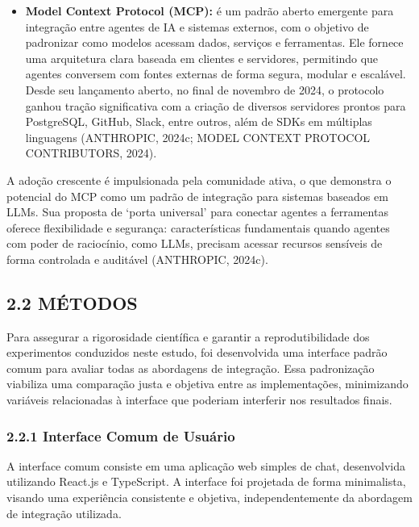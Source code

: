 \documentclass[
]{article}
\providecommand{\tightlist}{%
  \setlength{\itemsep}{0pt}\setlength{\parskip}{0pt}}
\begin{document}
\begin{itemize}
\tightlist
\item
  \textbf{Model Context Protocol (MCP):} é um padrão aberto emergente
  para integração entre agentes de IA e sistemas externos, com o
  objetivo de padronizar como modelos acessam dados, serviços e
  ferramentas. Ele fornece uma arquitetura clara baseada em clientes e
  servidores, permitindo que agentes conversem com fontes externas de
  forma segura, modular e escalável. Desde seu lançamento aberto, no
  final de novembro de 2024, o protocolo ganhou tração significativa com
  a criação de diversos servidores prontos para PostgreSQL, GitHub,
  Slack, entre outros, além de SDKs em múltiplas linguagens (ANTHROPIC,
  2024c; MODEL CONTEXT PROTOCOL CONTRIBUTORS, 2024).
\end{itemize}

A adoção crescente é impulsionada pela comunidade ativa, o que demonstra
o potencial do MCP como um padrão de integração para sistemas baseados
em LLMs. Sua proposta de `porta universal' para conectar agentes a
ferramentas oferece flexibilidade e segurança: características
fundamentais quando agentes com poder de raciocínio, como LLMs, precisam
acessar recursos sensíveis de forma controlada e auditável (ANTHROPIC,
2024c).

\subsection{2.2 MÉTODOS}\label{muxe9todos}

Para assegurar a rigorosidade científica e garantir a reprodutibilidade
dos experimentos conduzidos neste estudo, foi desenvolvida uma interface
padrão comum para avaliar todas as abordagens de integração. Essa
padronização viabiliza uma comparação justa e objetiva entre as
implementações, minimizando variáveis relacionadas à interface que
poderiam interferir nos resultados finais.

\subsubsection{2.2.1 Interface Comum de
Usuário}\label{interface-comum-de-usuuxe1rio}

A interface comum consiste em uma aplicação web simples de chat,
desenvolvida utilizando React.js e TypeScript. A interface foi projetada
de forma minimalista, visando uma experiência consistente e objetiva,
independentemente da abordagem de integração utilizada.
\end{document}
